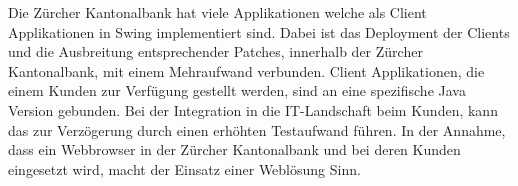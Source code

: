 Die Zürcher Kantonalbank hat viele Applikationen welche als Client Applikationen
in Swing implementiert sind. Dabei ist das Deployment der Clients und die
Ausbreitung entsprechender Patches, innerhalb der Zürcher Kantonalbank, mit
einem Mehraufwand verbunden. Client Applikationen, die einem Kunden zur
Verfügung gestellt werden, sind an eine spezifische Java Version gebunden. Bei
der Integration in die IT-Landschaft beim Kunden, kann das zur Verzögerung
durch einen erhöhten Testaufwand führen. In der Annahme, dass ein Webbrowser in
der Zürcher Kantonalbank und bei deren Kunden eingesetzt wird, macht der
Einsatz einer Weblösung Sinn.
